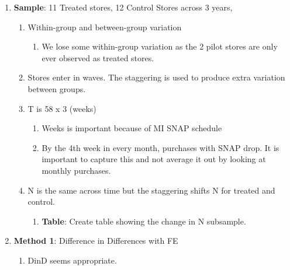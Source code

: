 \documentclass[12pt,letterpaperpaper,]{book}
\providecommand{\tightlist}{%
  \setlength{\itemsep}{0pt}\setlength{\parskip}{0pt}}
\begin{document}
\begin{enumerate}
\def\labelenumi{\arabic{enumi}.}
\tightlist
\item
  \textbf{Sample}: 11 Treated stores, 12 Control Stores across 3 years,

  \begin{enumerate}
  \def\labelenumii{\arabic{enumii}.}
  \setcounter{enumii}{2}
  \tightlist
  \item
    Within-group and between-group variation

    \begin{enumerate}
    \def\labelenumiii{\arabic{enumiii}.}
    \setcounter{enumiii}{3}
    \tightlist
    \item
      We lose some within-group variation as the 2 pilot stores are only
      ever observed as treated stores.
    \end{enumerate}
  \item
    Stores enter in waves. The staggering is used to produce extra
    variation between groups.
  \item
    T is 58 x 3 (weeks)

    \begin{enumerate}
    \def\labelenumiii{\arabic{enumiii}.}
    \setcounter{enumiii}{5}
    \tightlist
    \item
      Weeks is important because of MI SNAP schedule
    \item
      By the 4th week in every month, purchases with SNAP drop. It is
      important to capture this and not average it out by looking at
      monthly purchases.
    \end{enumerate}
  \item
    N is the same across time but the staggering shifts N for treated
    and control.

    \begin{enumerate}
    \def\labelenumiii{\arabic{enumiii}.}
    \setcounter{enumiii}{7}
    \tightlist
    \item
      \textbf{Table}: Create table showing the change in N subsample.
    \end{enumerate}
  \end{enumerate}
\item
  \textbf{Method 1}: Difference in Differences with FE

  \begin{enumerate}
  \def\labelenumii{\arabic{enumii}.}
  \setcounter{enumii}{4}
  \tightlist
  \item
    DinD seems appropriate.


\end{enumerate}
\end{enumerate}
\end{document}
